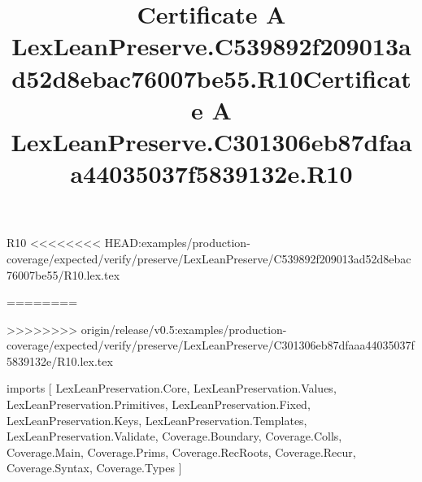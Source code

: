 \begin{lexlean}{R10}
<<<<<<<< HEAD:examples/production-coverage/expected/verify/preserve/LexLeanPreserve/C539892f209013ad52d8ebac76007be55/R10.lex.tex
\title{Certificate A LexLeanPreserve.C539892f209013ad52d8ebac76007be55.R10}
========
\title{Certificate A LexLeanPreserve.C301306eb87dfaaa44035037f5839132e.R10}
>>>>>>>> origin/release/v0.5:examples/production-coverage/expected/verify/preserve/LexLeanPreserve/C301306eb87dfaaa44035037f5839132e/R10.lex.tex
\begin{coremodule}
imports [
  LexLeanPreservation.Core,
  LexLeanPreservation.Values,
  LexLeanPreservation.Primitives,
  LexLeanPreservation.Fixed,
  LexLeanPreservation.Keys,
  LexLeanPreservation.Templates,
  LexLeanPreservation.Validate,
  Coverage.Boundary,
  Coverage.Colls,
  Coverage.Main,
  Coverage.Prims,
  Coverage.RecRoots,
  Coverage.Recur,
  Coverage.Syntax,
  Coverage.Types
]


\end{coremodule}
\end{lexlean}
